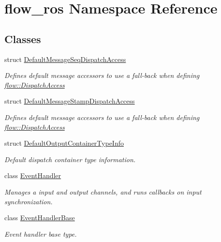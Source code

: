 \hypertarget{namespaceflow__ros}{}\section{flow\+\_\+ros Namespace Reference}
\label{namespaceflow__ros}
\subsection*{Classes}
\begin{DoxyCompactItemize}
\item 
struct \hyperlink{structflow__ros_1_1_default_message_seq_dispatch_access}{Default\+Message\+Seq\+Dispatch\+Access}
\begin{DoxyCompactList}\small\item\em Defines default message accessors to use a fall-\/back when defining {\ttfamily \hyperlink{structflow_1_1_dispatch_access}{flow\+::\+Dispatch\+Access}} \end{DoxyCompactList}\item 
struct \hyperlink{structflow__ros_1_1_default_message_stamp_dispatch_access}{Default\+Message\+Stamp\+Dispatch\+Access}
\begin{DoxyCompactList}\small\item\em Defines default message accessors to use a fall-\/back when defining {\ttfamily \hyperlink{structflow_1_1_dispatch_access}{flow\+::\+Dispatch\+Access}} \end{DoxyCompactList}\item 
struct \hyperlink{structflow__ros_1_1_default_output_container_type_info}{Default\+Output\+Container\+Type\+Info}
\begin{DoxyCompactList}\small\item\em Default dispatch container type information. \end{DoxyCompactList}\item 
class \hyperlink{classflow__ros_1_1_event_handler}{Event\+Handler}
\begin{DoxyCompactList}\small\item\em Manages a input and output channels, and runs callbacks on input synchronization. \end{DoxyCompactList}\item 
class \hyperlink{classflow__ros_1_1_event_handler_base}{Event\+Handler\+Base}
\begin{DoxyCompactList}\small\item\em Event handler base type. \end{DoxyCompactList}\item 

\end{DoxyCompactItemize}
